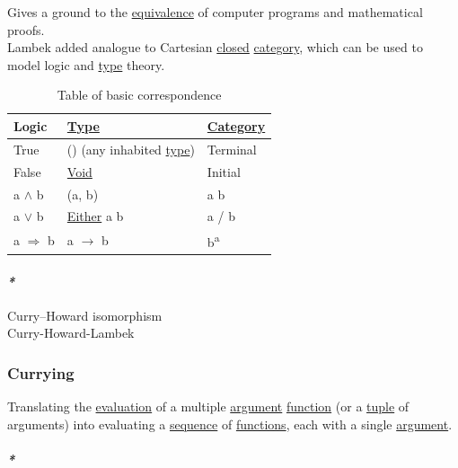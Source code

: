\documentclass[11pt]{article}
\begin{document}
Gives a ground to the \hyperref[orgbc0d2cd]{equivalence} of computer programs and mathematical proofs.\\

Lambek added analogue to Cartesian \hyperref[orgcdd7006]{closed} \hyperref[org0450535]{category}, which can be used to model logic and \hyperref[orgc4aea2f]{type} theory.\\

\begin{table}[htbp]
\caption{\label{tab:table-of-basic-correspondence}Table of basic correspondence}
\centering
\begin{tabular}{lll}
Logic & \hyperref[orgc4aea2f]{Type} & \hyperref[org0450535]{Category}\\
\hline
True & () (any inhabited \hyperref[orgc4aea2f]{type}) & Terminal\\
False & \hyperref[org2fad40d]{Void} & Initial\\
a \(\land\) b & (a, b) & a \texttimes{} b\\
a \(\lor\) b & \hyperref[org6f16842]{Either} a b & a /     b\\
a \(\Rightarrow\) b & a \(\to\) b & b\textsuperscript{a}\\
\end{tabular}
\end{table}

\paragraph{\emph{*}}
\label{sec:orge49694c}

\label{org5bd065a}Curry–Howard isomorphism\\
\label{orgbad7002}Curry-Howard-Lambek\\

\subsubsection{\label{org799fb48}Currying}
\label{sec:org9a41036}
Translating the \hyperref[orgbb765d1]{evaluation} of a multiple \hyperref[orga6b7e97]{argument} \hyperref[orge15bc14]{function} (or a \hyperref[orgdf7eddf]{tuple} of arguments) into evaluating a \hyperref[org522d1b0]{sequence} of \hyperref[orgaa8fb87]{functions}, each with a single \hyperref[orga6b7e97]{argument}.\\

\paragraph{\emph{*}}
\label{sec:org5f05ae9}
\end{document}
